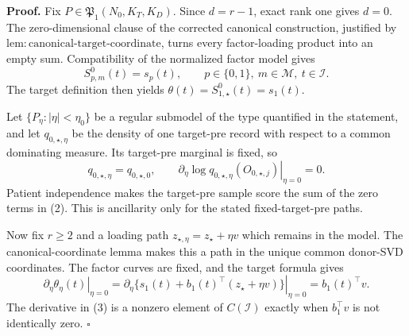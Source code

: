 \textbf{Proof.}
Fix \(P\in\mathfrak P_1(N_0,K_T,K_D)\). Since \(d=r-1\), exact rank one gives \(d=0\). The zero-dimensional clause of the corrected canonical construction, justified by \(\mathrm{lem:canonical\mbox{-}target\mbox{-}coordinate}\), turns every factor-loading product into an empty sum. Compatibility of the normalized factor model gives
\[
 S^0_{p,m}(t)=s_p(t),
 \qquad p\in\{0,1\},\ m\in\mathcal M,\ t\in\mathcal I.  \tag{1}
\]
The target definition then yields \(\theta(t)=S^0_{1,\star}(t)=s_1(t)\).

Let \(\{P_\eta:|\eta|<\eta_0\}\) be a regular submodel of the type quantified in the statement, and let \(q_{0,\star,\eta}\) be the density of one target-pre record with respect to a common dominating measure. Its target-pre marginal is fixed, so
\[
 q_{0,\star,\eta}=q_{0,\star,0},
 \qquad
 \left.\partial_\eta\log q_{0,\star,\eta}(O_{0,\star,j})
 \right|_{\eta=0}=0.                                      \tag{2}
\]
Patient independence makes the target-pre sample score the sum of the zero terms in (2). This is ancillarity only for the stated fixed-target-pre paths.

Now fix \(r\ge2\) and a loading path \(z_{\star,\eta}=z_\star+\eta v\) which remains in the model. The canonical-coordinate lemma makes this a path in the unique common donor-SVD coordinates. The factor curves are fixed, and the target formula gives
\[
 \left.\partial_\eta\theta_\eta(t)\right|_{\eta=0}
 =\left.\partial_\eta\{s_1(t)+b_1(t)^\top(z_\star+\eta v)\}
 \right|_{\eta=0}=b_1(t)^\top v.                          \tag{3}
\]
The derivative in (3) is a nonzero element of \(C(\mathcal I)\) exactly when \(b_1^\top v\) is not identically zero. \(\square\)